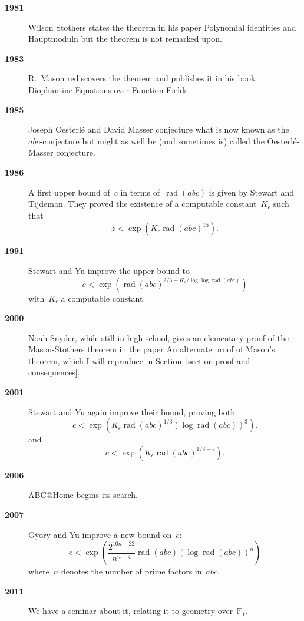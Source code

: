 \documentclass[11pt, a4paper, openany, oneside, article]{memoir}
\theoremstyle{definition}
\DeclareMathOperator\rad{rad}
\begin{document}
\begin{description}
  \item[\textbf{1981}] Wilson Stothers states the theorem in his paper Polynomial identities and Hauptmoduln but the theorem is not remarked upon.
  \item[\textbf{1983}] R.\ Mason rediscovers the theorem and publishes it in his book Diophantine Equations over Function Fields.
  \item[\textbf{1985}] Joseph Oesterl\'e and David Masser conjecture what is now known as the~$abc$\nobreakdash-conjecture but might as well be (and sometimes is) called the Oesterl\'e-Masser conjecture.

  \item[\textbf{1986}] A first upper bound of~$c$ in terms of~$\rad(abc)$ is given by Stewart and Tijdeman. They proved the existence of a computable constant~$K_{\epsilon}$ such that
    \begin{equation}
      z<\exp(K_{\epsilon}\rad(abc)^{15}).
    \end{equation}
  \item[\textbf{1991}] Stewart and Yu improve the upper bound to
    \begin{equation}
      c<\exp\left( \rad(abc)^{2/3+K_{\epsilon}/\log\log\rad(abc)} \right)
    \end{equation}
    with~$K_{\epsilon}$ a computable constant.
  \item[\textbf{2000}] Noah Snyder, while still in high school, gives an elementary proof of the Mason-Stothers theorem in the paper An alternate proof of Mason's theorem, which I will reproduce in Section~\ref{section:proof-and-consequences}.
  \item[\textbf{2001}] Stewart and Yu again improve their bound, proving both
    \begin{equation}
      c<\exp\left( K_{\epsilon}\rad(abc)^{1/3}(\log\rad(abc))^3 \right).
    \end{equation}
    and
    \begin{equation}
      c<\exp\left( K_{\epsilon}\rad(abc)^{1/3+\epsilon} \right).
    \end{equation}
  \item[\textbf{2006}] ABC@Home begins its search.

  \item[\textbf{2007}] G\"yory and Yu improve a new bound on~$c$:
    \begin{equation}
      c<\exp\left( \frac{2^{10n+22}}{n^{n-4}}\rad(abc)(\log\rad(abc))^n \right)
    \end{equation}
    where~$n$ denotes the number of prime factors in~$abc$.
  \item[\textbf{2011}] We have a seminar about it, relating it to geometry over~$\mathbb{F}_1$.
\end{description}
\end{document}
